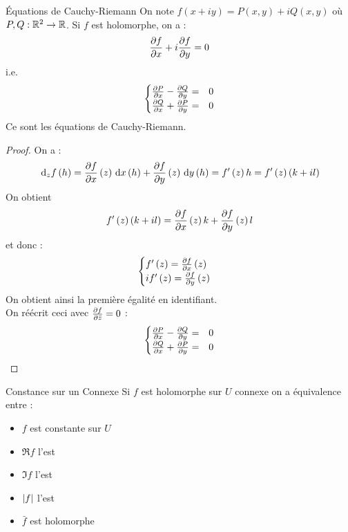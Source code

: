 \documentclass{cours}
\begin{document}
\begin{propositionfr}{Équations de Cauchy-Riemann}{}
	On note $f\left(x +iy\right) = P\left(x, y\right) + iQ\left(x, y\right)$ où $P, Q : \mathbb{R}^{2} \to \mathbb{R}$. Si $f$ est holomorphe, on a :  
	\begin{equation*}	
		\frac{\partial f}{\partial x} + i\frac{\partial f}{\partial y} = 0
	\end{equation*}
	i.e. 
	\begin{equation*}
		\begin{cases}
			\frac{\partial P}{\partial x} - \frac{\partial Q}{\partial y} =& 0\\
			\frac{\partial Q}{\partial x} + \frac{\partial P}{\partial y} =& 0
		\end{cases}
	\end{equation*}
	Ce sont les équations de Cauchy-Riemann.
\end{propositionfr}
\begin{proof}
	On a : 
	\begin{equation*}
		{\rm \, d}_{z}f\left(h\right) = \frac{\partial f}{\partial x}\left(z\right){\rm \, d} x\left(h\right) + \frac{\partial f}{\partial y}\left(z\right){\rm \, d} y\left(h\right) = f'\left(z\right)h = f'\left(z\right)\left(k + il\right)
	\end{equation*}
	On obtient 
	\begin{equation*}	
		f'\left(z\right)\left(k + il\right) = \frac{\partial f}{\partial x}\left(z\right)k + \frac{\partial f}{\partial y}\left(z\right)l
	\end{equation*}
	et donc : 
	\begin{equation*}
		\begin{cases}
			f'\left(z\right) = \frac{\partial f}{\partial x}\left(z\right)&\\
			if'\left(z\right) = \frac{\partial f}{\partial y}\left(z\right)
		\end{cases}
	\end{equation*}
	On obtient ainsi la première égalité en identifiant.\\
	On réécrit ceci avec $\frac{\partial f}{\partial \bar{z}} = 0$ : 
	\begin{equation*}
		\begin{cases}
			\frac{\partial P}{\partial x} - \frac{\partial Q}{\partial y} =& 0\\
			\frac{\partial Q}{\partial x} + \frac{\partial P}{\partial y} =& 0
		\end{cases}
	\end{equation*}
\end{proof}

\begin{propositionfr}{Constance sur un Connexe}{}
	Si $f$ est holomorphe sur $U$ connexe on a équivalence entre : 
	\begin{itemize}
		\item $f$ est constante sur $U$
		\item $\Re f$ l'est
		\item $\Im f$ l'est
		\item $\left|f\right|$ l'est
		\item $\bar{f}$ est holomorphe
	\end{itemize}
\end{propositionfr}
\end{document}
